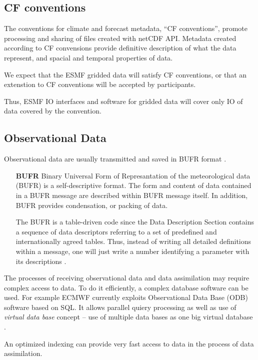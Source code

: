 \subsection{CF conventions} 

The conventions for climate and forecast metadata, ``CF conventions'',
\cite{NetCDF_CF_v1_beta3} promote processing and sharing of files
created with netCDF API. Metadata created according to CF convensions
provide definitive description of what the data represent, and spacial
and temporal properties of data.

We expect that the ESMF gridded data will satisfy CF conventions, or
that an extenstion to CF conventions will be accepted by participants.

Thus, ESMF IO interfaces and software for gridded data will cover only
IO of data covered by the convention.

\subsection{Observational Data}

Observational data are usually transmitted and saved in BUFR format 
\cite{WMO-BUFR-CREX}. 

\begin{itemize}
\item[\bf BUFR] Binary Universal Form of Represantation
of the meteorological data (BUFR) is a self-descriptive format. The
form and content of data contained in a BUFR message are described
within BUFR message itself. In addition, BUFR provides condensation,
or packing of data. 

The BUFR is a table-driven code since the Data Description Section
contains a sequence of data descriptors referring to a set of predefined and 
internationally agreed tables. Thus, instead of writing all detailed
definitions within a message, one will just write a number identifying
a parameter with its descriptions \cite{WMO-BUFR-CREX}.
\end{itemize}

The processes of receiving observational data and data assimilation
may require complex access to data. To do it efficiently, a complex
database software can be used. For example ECMWF currently exploits
Observational Data Base (ODB) software based on SQL. It allows
parallel quiery processing as well as use of {\em virtual data base}
concept -- use of multiple data bases as one big virtual database
\cite{ODB}. 

An optimized indexing can provide very fast access to data in the
process of data assimilation.


